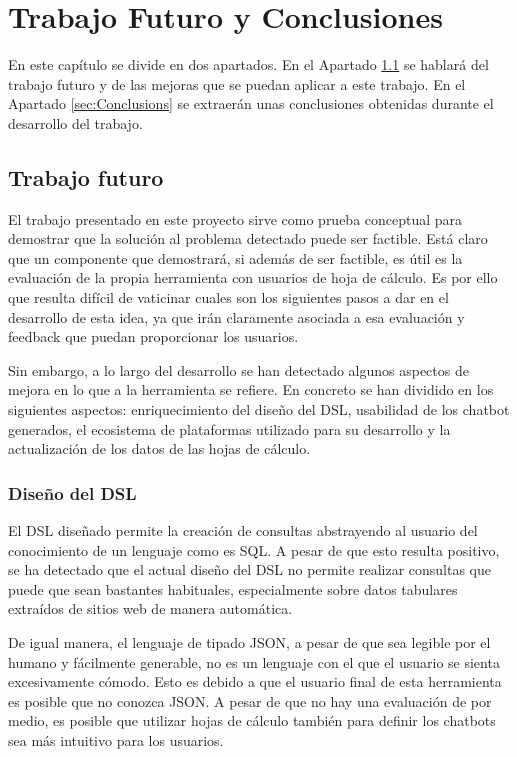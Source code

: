 \chapter{Trabajo Futuro y Conclusiones}
\label{cha:FutureWorkAndConclusions}

En este capítulo se divide en dos apartados. En el Apartado \ref{sec:FutureWork} se hablará del trabajo futuro y de las mejoras que se puedan aplicar a este trabajo. En el Apartado \ref{sec:Conclusions} se extraerán unas conclusiones obtenidas durante el desarrollo del trabajo.

\section{Trabajo futuro}
\label{sec:FutureWork}

El trabajo presentado en este proyecto sirve como prueba conceptual para demostrar que la solución al problema detectado puede ser factible. Está claro que un componente que demostrará, si además de ser factible, es útil es la evaluación de la propia herramienta con usuarios de hoja de cálculo. Es por ello que resulta difícil de vaticinar cuales son los siguientes pasos a dar en el desarrollo de esta idea, ya que irán claramente asociada a esa evaluación y feedback que puedan proporcionar los usuarios.

Sin embargo, a lo largo del desarrollo se han detectado algunos aspectos de mejora en lo que a la herramienta se refiere. En concreto se han dividido en los siguientes aspectos: enriquecimiento del diseño del DSL, usabilidad de los chatbot generados, el ecosistema de plataformas utilizado para su desarrollo y la actualización de los datos de las hojas de cálculo.

\subsection{Diseño del DSL}

El DSL diseñado permite la creación de consultas abstrayendo al usuario del conocimiento de un lenguaje como es SQL. A pesar de que esto resulta positivo, se ha detectado que el actual diseño del DSL no permite realizar consultas que puede que sean bastantes habituales, especialmente sobre datos tabulares extraídos de sitios web de manera automática.

De igual manera, el lenguaje de tipado JSON, a pesar de que sea legible por el humano y fácilmente generable, no es un lenguaje con el que el usuario se sienta excesivamente cómodo. Esto es debido a que el usuario final de esta herramienta es posible que no conozca JSON. A pesar de que no hay una evaluación de por medio, es posible que utilizar hojas de cálculo también para definir los chatbots sea más intuitivo para los usuarios.

